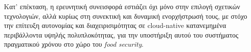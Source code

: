 Κατ’ επέκταση, η ερευνητική συνεισφορά εστιάζει όχι μόνο στην επιλογή σχετικών τεχνολογιών, αλλά κυρίως στη συνεκτική και δυναμική ενορχήστρωσή τους, με στόχο την επίτευξη αυτονομίας και διαχειρισιμότητας σε cloud-native κατανεμημένα περιβάλλοντα υψηλής πολυπλοκότητας, για την υποστήριξη αυτού του συστήματος πραγματικού χρόνου στο χώρο του \textit{food security}.
